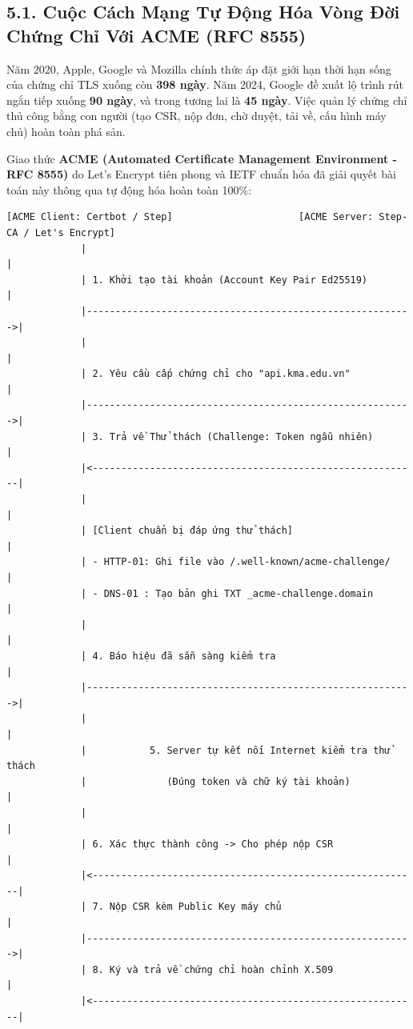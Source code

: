 \documentclass[
]{article}
\begin{document}
\subsection{5.1. Cuộc Cách Mạng Tự Động Hóa Vòng Đời Chứng Chỉ Với ACME
(RFC
8555)}\label{cuux1ed9c-cuxe1ch-mux1ea1ng-tux1ef1-ux111ux1ed9ng-huxf3a-vuxf2ng-ux111ux1eddi-chux1ee9ng-chux1ec9-vux1edbi-acme-rfc-8555}

Năm 2020, Apple, Google và Mozilla chính thức áp đặt giới hạn thời hạn
sống của chứng chỉ TLS xuống còn \textbf{398 ngày}. Năm 2024, Google đề
xuất lộ trình rút ngắn tiếp xuống \textbf{90 ngày}, và trong tương lai
là \textbf{45 ngày}. Việc quản lý chứng chỉ thủ công bằng con người (tạo
CSR, nộp đơn, chờ duyệt, tải về, cấu hình máy chủ) hoàn toàn phá sản.

Giao thức \textbf{ACME (Automated Certificate Management Environment -
RFC 8555)} do Let's Encrypt tiên phong và IETF chuẩn hóa đã giải quyết
bài toán này thông qua tự động hóa hoàn toàn 100\%:

\begin{verbatim}
[ACME Client: Certbot / Step]                      [ACME Server: Step-CA / Let's Encrypt]
             |                                                          |
             | 1. Khởi tạo tài khoản (Account Key Pair Ed25519)         |
             |--------------------------------------------------------->|
             |                                                          |
             | 2. Yêu cầu cấp chứng chỉ cho "api.kma.edu.vn"            |
             |--------------------------------------------------------->|
             | 3. Trả về Thử thách (Challenge: Token ngẫu nhiên)       |
             |<---------------------------------------------------------|
             |                                                          |
             | [Client chuẩn bị đáp ứng thử thách]                     |
             | - HTTP-01: Ghi file vào /.well-known/acme-challenge/    |
             | - DNS-01 : Tạo bản ghi TXT _acme-challenge.domain        |
             |                                                          |
             | 4. Báo hiệu đã sẵn sàng kiểm tra                         |
             |--------------------------------------------------------->|
             |                                                          |
             |           5. Server tự kết nối Internet kiểm tra thử thách
             |              (Đúng token và chữ ký tài khoản)           |
             |                                                          |
             | 6. Xác thực thành công -> Cho phép nộp CSR               |
             |<---------------------------------------------------------|
             | 7. Nộp CSR kèm Public Key máy chủ                        |
             |--------------------------------------------------------->|
             | 8. Ký và trả về chứng chỉ hoàn chỉnh X.509               |
             |<---------------------------------------------------------|
\end{verbatim}
\end{document}
